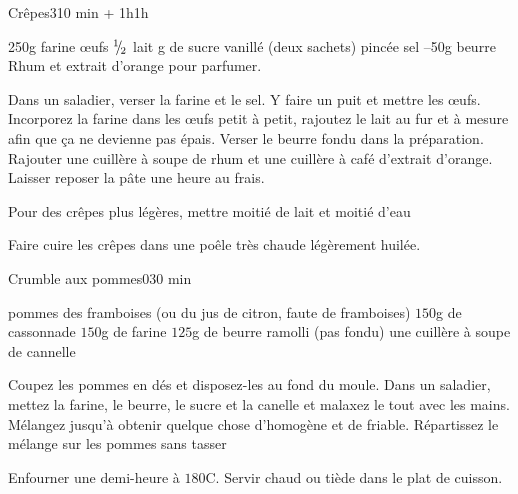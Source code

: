 \begin{recette}{Crêpes}{3}{10 min + 1h}{1h}
\begin{ingredients}
\ingredient 250g farine
 œufs
\ingredient ${{}^{1\!\!}/ _{\!2}}$ lait
 g de sucre vanillé (deux sachets)
 pincée sel
--50g beurre
\ingredient Rhum et extrait d'orange pour parfumer.
\end{ingredients}


\begin{preparation}
\etape Dans un saladier, verser la farine et le sel.
\etape Y faire un puit et mettre les œufs. Incorporez la farine dans les œufs petit à petit, rajoutez le lait au fur et à mesure afin que ça ne devienne pas épais.
\etape Verser le beurre fondu dans la préparation.
\etape Rajouter une cuillère à soupe de rhum et une cuillère à café d'extrait d'orange.
\etape Laisser reposer la pâte une heure au frais.
\end{preparation}

\begin{remarque}
Pour des crêpes plus légères, mettre moitié de lait et moitié d'eau
\end{remarque}

\begin{cuisson}
Faire cuire les crêpes dans une poêle très chaude légèrement huilée.
\end{cuisson}
\end{recette}

\begin{recette}{Crumble aux pommes}{0}{}{30 min}
\begin{ingredients}
 pommes
\ingredient des framboises (ou du jus de citron, faute de framboises)
\ingredient $150$g de cassonnade
\ingredient $150$g de farine
\ingredient $125$g de beurre ramolli (pas fondu)
\ingredient une cuillère à soupe de cannelle
\end{ingredients}

\begin{preparation}
\etape Coupez les pommes en dés et disposez-les au fond du moule.
\etape Dans un saladier, mettez la farine, le beurre, le sucre et la canelle et malaxez le tout avec les mains. Mélangez jusqu'à obtenir quelque chose d'homogène et de friable.
\etape Répartissez le mélange sur les pommes sans tasser
\end{preparation}

\begin{cuisson}
Enfourner une demi-heure à $180$\degres C. Servir chaud ou tiède dans le plat de cuisson.
\end{cuisson}
\end{recette}


